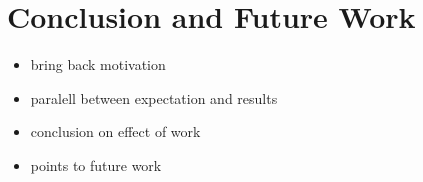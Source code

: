 \chapter{Conclusion and Future Work}

\begin{itemize}
  \item bring back motivation
  \item paralell between expectation and results
  \item conclusion on effect of work
  \item points to future work
\end{itemize}

